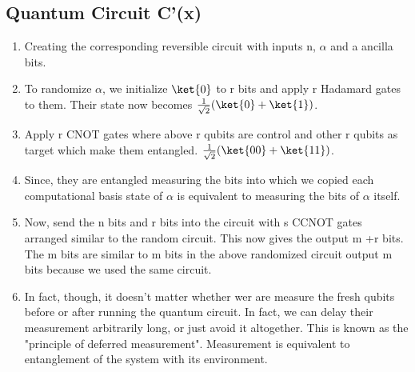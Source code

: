 \documentclass[11pt, a4paper]{article}
\begin{document}
\subsection{Quantum Circuit C'(x)}
    \begin{enumerate}
        \item Creating the corresponding reversible circuit with inputs n, \(\alpha\)  and a ancilla bits. 
        \item To randomize \(\alpha\), we initialize  \(\ket{0}\) to r bits and apply r Hadamard gates to them. Their state now becomes \(\frac{1}{\sqrt{2} }(\ket{0}+\ket{1})\). 
        \item Apply r CNOT gates where above r qubits are control and other r qubits as target which make them entangled. \(\frac{1}{\sqrt{2} }(\ket{00}+\ket{11})\). 
        \item Since, they are entangled measuring the bits into which we copied each computational basis state of \(\alpha\) is equivalent to measuring the bits of \(\alpha\) itself. 
        \item Now, send the n bits and r bits into the circuit with s CCNOT gates arranged similar to the random circuit. This now gives the output m +r bits. The m bits are similar to m bits in the above randomized circuit output m bits because we used the same circuit. 
        \item In fact, though, it doesn't matter whether wer are measure the fresh qubits before or after running the quantum circuit. In fact, we can delay their measurement arbitrarily long, or just avoid it altogether. This is known as the "principle of deferred measurement". Measurement is equivalent to entanglement of the system with its environment. 
    \end{enumerate}
\end{document}
